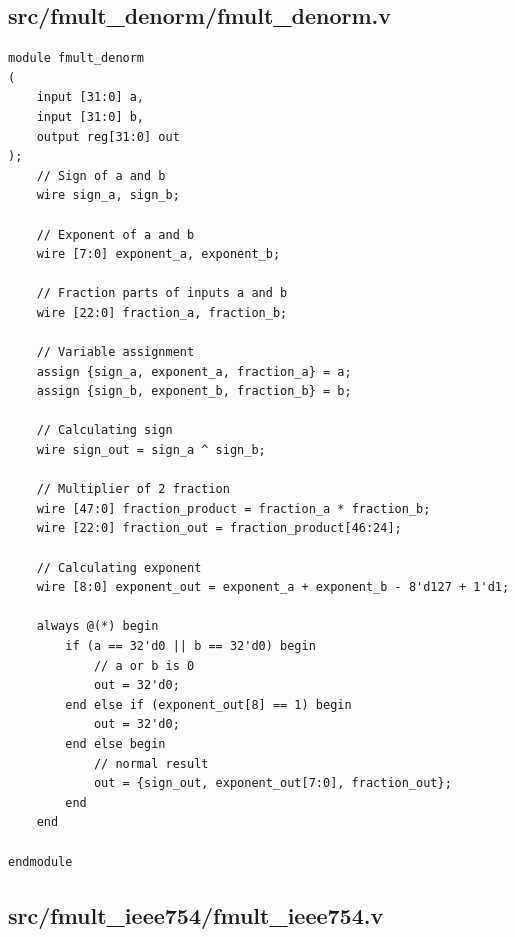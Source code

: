 \documentclass{article}
\begin{document}
\subsection{src/fmult\_denorm/fmult\_denorm.v}

\begin{lstlisting}
module fmult_denorm
(
    input [31:0] a,
    input [31:0] b,
    output reg[31:0] out
);
    // Sign of a and b
    wire sign_a, sign_b;

    // Exponent of a and b
    wire [7:0] exponent_a, exponent_b;

    // Fraction parts of inputs a and b
    wire [22:0] fraction_a, fraction_b;
    
    // Variable assignment
    assign {sign_a, exponent_a, fraction_a} = a;
    assign {sign_b, exponent_b, fraction_b} = b;
    
    // Calculating sign
    wire sign_out = sign_a ^ sign_b;

    // Multiplier of 2 fraction
    wire [47:0] fraction_product = fraction_a * fraction_b;
    wire [22:0] fraction_out = fraction_product[46:24];
    
    // Calculating exponent
    wire [8:0] exponent_out = exponent_a + exponent_b - 8'd127 + 1'd1;

    always @(*) begin
        if (a == 32'd0 || b == 32'd0) begin
            // a or b is 0
            out = 32'd0;
        end else if (exponent_out[8] == 1) begin
            out = 32'd0;
        end else begin
            // normal result
            out = {sign_out, exponent_out[7:0], fraction_out};
        end
    end

endmodule
\end{lstlisting}

\subsection{src/fmult\_ieee754/fmult\_ieee754.v}
\end{document}
